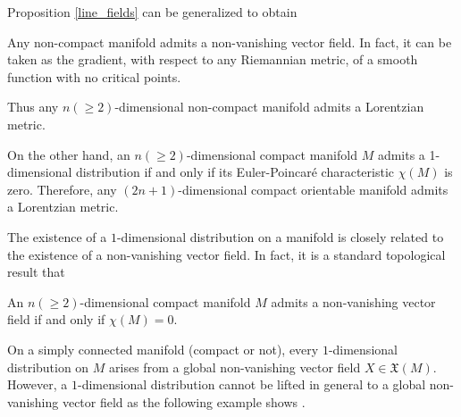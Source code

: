 Proposition \ref{line_fields} can be generalized to obtain \cite{greub72}

Any non-compact manifold admits a non-vanishing vector field. In fact, it can be taken as the gradient, with respect to any Riemannian metric, of a smooth function with no critical points.

Thus any $n(\geq 2)$-dimensional non-compact manifold admits a Lorentzian metric.

On the other hand, an $n(\geq 2)$-dimensional compact manifold $M$ admits a 1-dimensional distribution if and only if its Euler-Poincar\'{e} characteristic $\chi (M)$ is zero. Therefore, any $(2n+1)$-dimensional compact orientable manifold admits a Lorentzian metric.

\vspace{2mm}

The existence of a $1$-dimensional distribution on a manifold is closely related to the existence of a non-vanishing vector field. In fact, it is a standard topological result that

\begin{proposition}
    An $n(\geq 2)$-dimensional compact manifold $M$ admits a non-vanishing vector field if and only if $\chi(M)=0$.
\end{proposition}


On a simply connected manifold (compact or not), every $1$-dimensional distribution on $M$ arises from a global non-vanishing vector field $X\in \mathfrak{X}(M)$. However, a $1$-dimensional distribution cannot be lifted in general to a global non-vanishing vector field as the following example shows \cite{greub72}.


